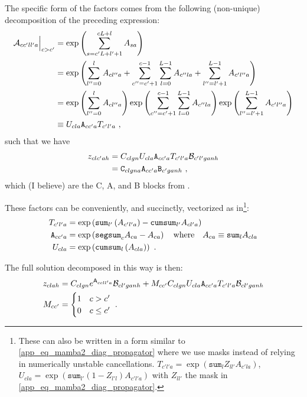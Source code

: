 The specific form of the factors comes from the following (non-unique) decomposition of the
preceding expression:
\begin{align}
    \mathcal{A}_{ cc'll'a }\Big|_{ c>c' } &=\exp \left ( \sum_{ s= c'L + l' + 1 }^{ cL + l  }A _{ sa } \right ) \nonumber\\
                            &= \exp \left (\sum _{ l''=0 }^{ l }A_{ cl''a} +\sum_{ c''=c'+1 }^{ c-1 }\sum_{ l=0 }^{ L-1 }A_{ c''la }  + \sum _{ l''=l'+1 }^{ L-1  }A_{ c'l''a} \right )\nonumber\\
                            &= \exp \left (\sum _{ l''=0 }^{ l }A_{ cl''a}\right ) \exp \left (\sum_{ c''=c'+1 }^{ c-1 }\sum_{ l=0 }^{ L-1 }A_{ c''la }  \right ) \exp \left ( \sum _{ l''=l'+1 }^{ L-1  }A_{ c'l''a} \right ) \nonumber\\
                            &\equiv U_{ cla }\texttt{A}_{ cc'a }T_{ c'l'a }\ ,
\end{align}
such that we have
\begin{align}
z_{ clc'ah }&= C _{ clgn }U_{ cla }\texttt{A}_{ cc'a }T_{ c'l'a }\mathcal{B}_{ c'l'ganh }\nonumber\\
            &= \texttt{C}_{ clgna }\texttt{A}_{ cc'a }\texttt{B}_{ c'ganh }\ ,
\end{align}
which (I believe) are the C, A, and B blocks from \cite{dao2024transformersssmsgeneralizedmodels}.


These factors can be conveniently, and succinctly, vectorized as in\footnote{These can also be written in a form
similar to \eqref{app_eq_mamba2_diag_propagator} where we use masks instead of relying in
numerically unstable cancellations. $ T_{ c'l'a  }= \exp\left (\texttt{sum}_{ l }Z_{ ll' }A_{ c'la
}\right ) $, $ U_{ cla  }= \exp\left (\texttt{sum}_{ l' }\left (1 - Z_{ l'l }\right )A_{ c'l'a  }\right ) $
with $ Z_{ ll' } $ the mask in \eqref{app_eq_mamba2_diag_propagator}.
}:
\begin{align}
    T_{ c'l'a } &=\exp\left ( \texttt{sum}_{ l' }\left ( A_{ c'l'a } \right ) - \texttt{cumsum}_{ l' }A_{ cl'a } \right )\nonumber\\
    \texttt{A}_{ cc'a }&=\exp \left ( \texttt{segsum}_{ c }A_{ ca } - A_{ ca }  \right ) \quad {\rm where}  \quad A_{ ca  }\equiv \texttt{sum}_{ l }A_{ cla  }\nonumber\\
    U_{ cla } &=\exp\left ( \texttt{cumsum}_{ l }\left ( A_{ cla } \right ) \right ) \ .
\end{align}

The full solution decomposed in this way is then:
\begin{align}
    z _{ clah } &= C _{ clgn }e^{ \mathsf{A}_{ ccll'a } }\mathcal{B}_{ cl'ganh } + M_{ cc' }C _{ clgn }U_{ cla }\texttt{A}_{ cc'a }T_{ c'l'a }\mathcal{B}_{ cl'ganh }\nonumber\\
    M_{ cc' } & = \begin{cases}
           1 & c > c'\\
           0 & c \le c'
       \end{cases} \ .
\end{align}


